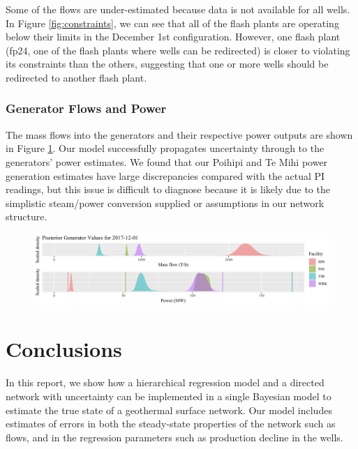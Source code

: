 \documentclass[a4paper, 12pt]{article}
\begin{document}
Some of the flows are under-estimated because data is not available for all wells. In Figure \ref{fig:constraints}, we can see that all of the flash plants are operating below their limits in the December 1st configuration. However, one flash plant (fp24, one of the flash plants where wells can be redirected) is closer to violating its constraints than the others, suggesting that one or more wells should be redirected to another flash plant.

\subsubsection{Generator Flows and Power}
The mass flows into the generators and their respective power outputs are shown in Figure \ref{fig:gens}. Our model successfully propagates uncertainty through to the generators' power estimates. We found that our Poihipi and Te Mihi power generation estimates have large discrepancies compared with the actual PI readings, but this issue is difficult to diagnose because it is likely due to the simplistic steam/power conversion supplied or assumptions in our network structure.

\begin{figure}
\centering
  \includegraphics[width=\linewidth]{media/gens}
  \label{fig:gens}
\end{figure}

\section{Conclusions}
In this report, we show how a hierarchical regression model and a directed network with uncertainty can be implemented in a single Bayesian model to estimate the true state of a geothermal surface network. Our model includes estimates of errors in both the steady-state properties of the network such as flows, and in the regression parameters such as production decline in the wells.
\end{document}
